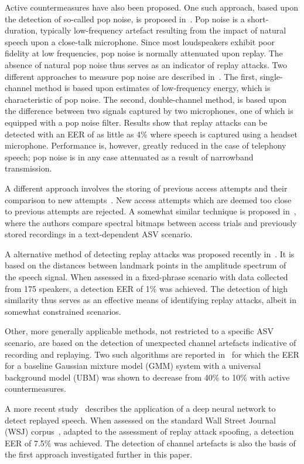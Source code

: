 Active countermeasures have also been proposed.  One such approach, based upon the detection of so-called pop noise, is proposed in~\cite{Shiota2015}.  Pop noise is a short-duration, typically low-frequency artefact resulting from the impact of natural speech upon a close-talk microphone.  Since most loudspeakers exhibit poor fidelity at low frequencies, pop noise is normally attenuated upon replay.  The absence of natural pop noise thus serves as an indicator of replay attacks.  Two different approaches to measure pop noise are described in~\cite{Shiota2015}.  The first, single-channel method is based upon estimates of low-frequency energy, which is characteristic of pop noise.  The second, double-channel method, is based upon the difference between two signals captured by two microphones, one of which is equipped with a pop noise filter.  Results show that replay attacks can be detected with an EER of as little as 4\% where speech is captured using a headset microphone.  Performance is, however, greatly reduced in the case of telephony speech; pop noise is in any case attenuated as a result of narrowband transmission.

A different approach involves the storing of previous access attempts and their comparison to new attempts~\cite{Shang2010}.
New access attempts which are deemed too close to previous attempts are rejected.
A somewhat similar technique is proposed in~\cite{Wu2014}, where the authors compare spectral bitmaps between access trials and previously stored recordings in a text-dependent ASV scenario. 

A alternative method of detecting replay attacks was proposed recently in~\cite{Galka2015}.  It is based on the distances between landmark points in the amplitude spectrum of the speech signal.  When assessed in a fixed-phrase scenario with data collected from 175 speakers, a detection EER of 1\% was achieved.  The detection of high similarity thus serves as an effective means of identifying replay attacks, albeit in somewhat constrained scenarios.

Other, more generally applicable methods, not restricted to a specific ASV scenario, are based on the detection of unexpected channel artefacts indicative of recording and replaying.
Two such algorithms are reported in~\cite{Wang2011} for which the EER for a baseline Gaussian mixture model (GMM) system with a universal background model (UBM) was shown to decrease from 40\% to 10\% with active countermeasures.  

A more recent study~\cite{Luo2015} describes the application of a deep neural network to detect replayed speech.  
When assessed on the standard Wall Street Journal (WSJ) corpus~\cite{WSJ1993}, adapted to the assessment of replay attack spoofing, a detection EER of 7.5\% was achieved.  The detection of channel artefacts is also the basis of the first approach investigated further in this paper.




